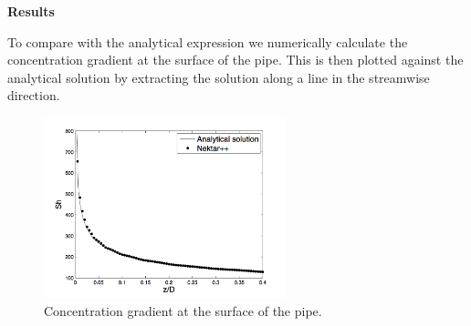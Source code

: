 \textbf{Results}

To compare with the analytical expression we numerically calculate the concentration gradient at the surface of the pipe. 
This is then plotted against the analytical solution by extracting the solution along a line in the streamwise direction.

\begin{figure}[h!]
\begin{center}
\includegraphics[width=7cm]{Figures/graetz-nusselt}
\caption{Concentration gradient at the surface of the pipe.}
\end{center}
\end{figure}



